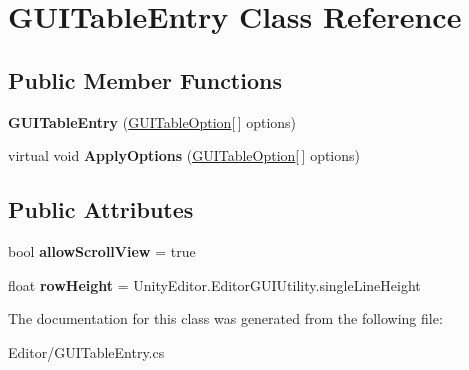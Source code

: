 \hypertarget{class_g_u_i_table_entry}{}\section{G\+U\+I\+Table\+Entry Class Reference}
\label{class_g_u_i_table_entry}
\subsection*{Public Member Functions}
\begin{DoxyCompactItemize}
\item 
\mbox{\label{class_g_u_i_table_entry_ac3f1b59a8b7b33f7d416adda7f980eda}} 
{\bfseries G\+U\+I\+Table\+Entry} (\mbox{\hyperlink{class_g_u_i_table_option}{G\+U\+I\+Table\+Option}}\mbox{[}$\,$\mbox{]} options)
\item 
\mbox{\label{class_g_u_i_table_entry_aa267d3b6ce27f3dffc1fbbc9d42d4197}} 
virtual void {\bfseries Apply\+Options} (\mbox{\hyperlink{class_g_u_i_table_option}{G\+U\+I\+Table\+Option}}\mbox{[}$\,$\mbox{]} options)
\end{DoxyCompactItemize}
\subsection*{Public Attributes}
\begin{DoxyCompactItemize}
\item 
\mbox{\label{class_g_u_i_table_entry_a933d5e5d4c527e0dbbbdb956dc3f2121}} 
bool {\bfseries allow\+Scroll\+View} = true
\item 
\mbox{\label{class_g_u_i_table_entry_a41a4b33f64cda77d0b314c3192068c7f}} 
float {\bfseries row\+Height} = Unity\+Editor.\+Editor\+G\+U\+I\+Utility.\+single\+Line\+Height
\end{DoxyCompactItemize}


The documentation for this class was generated from the following file\+:\begin{DoxyCompactItemize}
\item 
Editor/G\+U\+I\+Table\+Entry.\+cs\end{DoxyCompactItemize}

